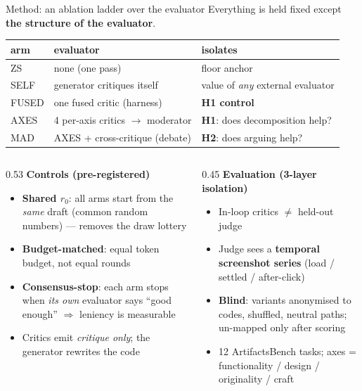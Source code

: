 \documentclass[aspectratio=169,10pt]{beamer}
\newcommand{\hl}[1]{\textbf{\color{navymain}#1}}
\begin{document}
\begin{frame}{Method: an ablation ladder over the evaluator}
\scriptsize
Everything is held fixed except \hl{the structure of the evaluator}.

\vspace{0.3em}
\begin{center}
\begin{tabular}{@{}llp{5.4cm}@{}}
\toprule
\textbf{arm} & \textbf{evaluator} & \textbf{isolates} \\
\midrule
ZS    & none (one pass)                  & floor anchor \\
SELF  & generator critiques itself       & value of \emph{any} external evaluator \\
FUSED & one fused critic (harness)       & \hl{H1 control} \\
AXES  & 4 per-axis critics $\rightarrow$ moderator & \hl{H1}: does decomposition help? \\
MAD   & AXES + cross-critique (debate)   & \hl{H2}: does arguing help? \\
\bottomrule
\end{tabular}
\end{center}

\vspace{0.4em}
\begin{columns}[T,onlytextwidth]
\begin{column}{0.53\textwidth}
\textbf{\color{navymain}Controls (pre-registered)}
\begin{itemize}\itemsep0.1em
  \item \hl{Shared $r_0$}: all arms start from the \emph{same} draft
        (common random numbers) --- removes the draw lottery
  \item \hl{Budget-matched}: equal token budget, not equal rounds
  \item \hl{Consensus-stop}: each arm stops when \emph{its own}
        evaluator says ``good enough'' $\Rightarrow$ leniency is measurable
  \item Critics emit \emph{critique only}; the generator rewrites the code
\end{itemize}
\end{column}
\begin{column}{0.45\textwidth}
\textbf{\color{navymain}Evaluation (3-layer isolation)}
\begin{itemize}\itemsep0.1em
  \item In-loop critics $\neq$ held-out judge
  \item Judge sees a \hl{temporal screenshot series} (load / settled / after-click)
  \item \hl{Blind}: variants anonymised to codes, shuffled, neutral paths;
        un-mapped only after scoring
  \item 12 ArtifactsBench tasks; axes = functionality / design / originality / craft
\end{itemize}
\end{column}
\end{columns}
\end{frame}
\end{document}
